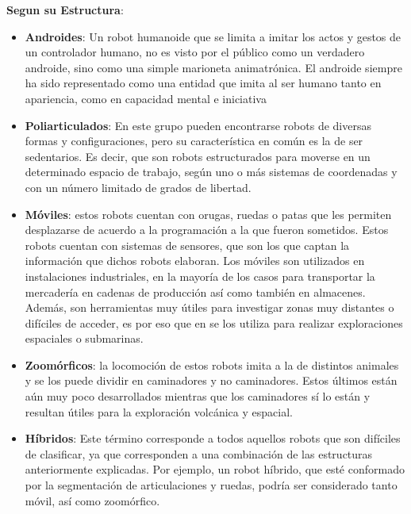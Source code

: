 \textbf{Segun su Estructura}:
\begin{itemize}
\item \textbf{Androides}: Un robot humanoide que se limita a imitar los actos y gestos de un controlador humano, no es visto por el público como un verdadero androide, sino como una simple marioneta animatrónica. El androide siempre ha sido representado como una entidad que imita al ser humano tanto en apariencia, como en capacidad mental e iniciativa

\item \textbf{Poliarticulados}: En este grupo pueden encontrarse robots de diversas formas y configuraciones, pero su característica en común es la de ser sedentarios. Es decir, que son robots estructurados para moverse en un determinado espacio de trabajo, según uno o más sistemas de coordenadas y con un número limitado de grados de libertad.

\item \textbf{Móviles}: estos robots cuentan con orugas, ruedas o patas que les permiten desplazarse de acuerdo a la programación a la que fueron sometidos. Estos robots cuentan con sistemas de sensores, que son los que captan la información que dichos robots elaboran. Los móviles son utilizados en instalaciones industriales, en la mayoría de los casos para transportar la mercadería en cadenas de producción así como también en almacenes. Además, son herramientas muy útiles para investigar zonas muy distantes o difíciles de acceder, es por eso que en se los utiliza para realizar exploraciones espaciales o submarinas.

\item \textbf{Zoomórficos}: la locomoción de estos robots imita a la de distintos animales y se los puede dividir en caminadores y no caminadores. Estos últimos están aún muy poco desarrollados mientras que los caminadores sí lo están y resultan útiles para la exploración volcánica y espacial.

\item \textbf{Híbridos}: Este término corresponde a todos aquellos robots que son difíciles de clasificar, ya que corresponden a una combinación de las estructuras anteriormente explicadas. Por ejemplo, un robot híbrido, que esté conformado por la segmentación de articulaciones y ruedas, podría ser considerado tanto móvil, así como zoomórfico.

\end{itemize}

